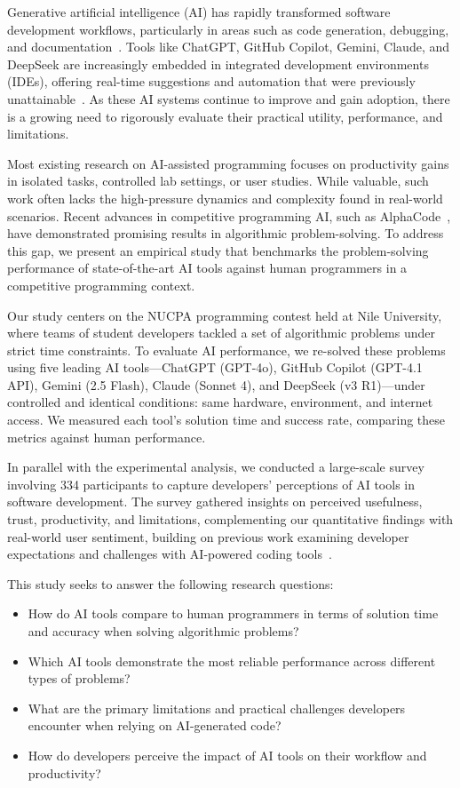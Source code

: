 \documentclass[conference]{IEEEtran}
\begin{document}
Generative artificial intelligence (AI) has rapidly transformed software development workflows, particularly in areas such as code generation, debugging, and documentation~\cite{chen2021}. Tools like ChatGPT, GitHub Copilot, Gemini, Claude, and DeepSeek are increasingly embedded in integrated development environments (IDEs), offering real-time suggestions and automation that were previously unattainable~\cite{github2024}. As these AI systems continue to improve and gain adoption, there is a growing need to rigorously evaluate their practical utility, performance, and limitations.

Most existing research on AI-assisted programming focuses on productivity gains in isolated tasks, controlled lab settings, or user studies. While valuable, such work often lacks the high-pressure dynamics and complexity found in real-world scenarios. Recent advances in competitive programming AI, such as AlphaCode~\cite{li2022}, have demonstrated promising results in algorithmic problem-solving. To address this gap, we present an empirical study that benchmarks the problem-solving performance of state-of-the-art AI tools against human programmers in a competitive programming context.

Our study centers on the NUCPA programming contest held at Nile University, where teams of student developers tackled a set of algorithmic problems under strict time constraints. To evaluate AI performance, we re-solved these problems using five leading AI tools—ChatGPT (GPT-4o), GitHub Copilot (GPT-4.1 API), Gemini (2.5 Flash), Claude (Sonnet 4), and DeepSeek (v3 R1)—under controlled and identical conditions: same hardware, environment, and internet access. We measured each tool's solution time and success rate, comparing these metrics against human performance.

In parallel with the experimental analysis, we conducted a large-scale survey involving 334 participants to capture developers' perceptions of AI tools in software development. The survey gathered insights on perceived usefulness, trust, productivity, and limitations, complementing our quantitative findings with real-world user sentiment, building on previous work examining developer expectations and challenges with AI-powered coding tools~\cite{vaithilingam2022}.

This study seeks to answer the following research questions:
\begin{itemize}
    \item How do AI tools compare to human programmers in terms of solution time and accuracy when solving algorithmic problems?
    \item Which AI tools demonstrate the most reliable performance across different types of problems?
    \item What are the primary limitations and practical challenges developers encounter when relying on AI-generated code?
    \item How do developers perceive the impact of AI tools on their workflow and productivity?
\end{itemize}
\end{document}
